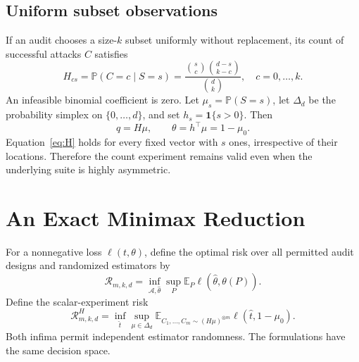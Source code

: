 \documentclass[conference]{IEEEtran}
\newcommand{\E}{\mathbb{E}}
\newcommand{\Prob}{\mathbb{P}}
\newcommand{\ind}{\mathbf{1}}
\newcommand{\simplex}{\Delta_d}
\begin{document}
\subsection{Uniform subset observations}
If an audit chooses a size-$k$ subset uniformly without replacement, its count of successful attacks $C$ satisfies
\begin{equation}\label{eq:H}
 H_{cs}=\Prob(C=c\mid S=s)
 =\frac{\binom{s}{c}\binom{d-s}{k-c}}{\binom{d}{k}},
 \quad c=0,\ldots,k.
\end{equation}
An infeasible binomial coefficient is zero. Let $\mu_s=\Prob(S=s)$, let $\simplex$ be the probability simplex on $\{0,\ldots,d\}$, and set $h_s=\ind\{s>0\}$. Then
\begin{equation}\label{eq:inverse}
 q=H\mu,\qquad \theta=h^\top\mu=1-\mu_0.
\end{equation}
Equation~\eqref{eq:H} holds for every fixed vector with $s$ ones, irrespective of their locations. Therefore the count experiment remains valid even when the underlying suite is highly asymmetric.

\section{An Exact Minimax Reduction}\label{sec:reduction}
For a nonnegative loss $\ell(t,\theta)$, define the optimal risk over all permitted audit designs and randomized estimators by
\begin{equation}
 \mathcal R_{m,k,d}=\inf_{\mathcal A,\widehat\theta}
 \sup_P \E_P\ell(\widehat\theta,\theta(P)).
\end{equation}
Define the scalar-experiment risk
\begin{equation}
 \mathcal R^{H}_{m,k,d}=\inf_{\widehat t}\sup_{\mu\in\simplex}
 \E_{C_1,\ldots,C_m\sim(H\mu)^{\otimes m}}
 \ell(\widehat t,1-\mu_0).
\end{equation}
Both infima permit independent estimator randomness. The formulations have the same decision space.
\end{document}
